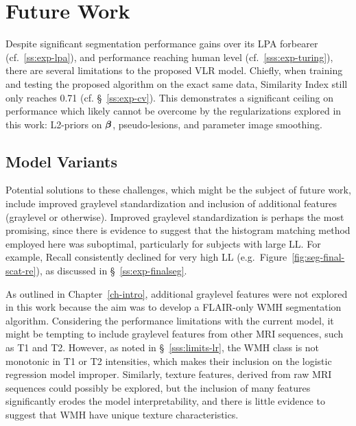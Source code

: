 \section{Future Work}
Despite significant segmentation performance gains over its LPA forbearer (cf.~\ref{ss:exp-lpa}),
and performance reaching human level (cf.~\ref{sss:exp-turing}),
there are several limitations to the proposed VLR model.
Chiefly, when training and testing the proposed algorithm on the exact same data,
Similarity Index still only reaches 0.71 (cf. \S~\ref{ss:exp-cv}).
This demonstrates a significant ceiling on performance
which likely cannot be overcome by the regularizations explored in this work:
L2-priors on $\bm{\beta}$, pseudo-lesions, and parameter image smoothing.
\subsection{Model Variants}
Potential solutions to these challenges, which might be the subject of future work, include
improved graylevel standardization and 
inclusion of additional features (graylevel or otherwise).
Improved graylevel standardization is perhaps the most promising,
since there is evidence to suggest that the histogram matching method employed
here was suboptimal, particularly for subjects with large LL.
For example, Recall consistently declined for very high LL
(e.g.\ Figure~\ref{fig:seg-final-scat-re}), as discussed in \S~\ref{ss:exp-finalseg}.
\par
As outlined in Chapter~\ref{ch-intro}, additional graylevel features were not explored in this work
because the aim was to develop a FLAIR-only WMH segmentation algorithm.
Considering the performance limitations with the current model,
it might be tempting to include graylevel features from other MRI sequences, such as T1 and T2.
However, as noted in \S~\ref{sss:limits-lr}, the WMH class is not monotonic in
T1 or T2 intensities, which makes their inclusion on the logistic regression model improper.
Similarly, texture features, derived from raw MRI sequences could possibly be explored,
but the inclusion of many features significantly erodes the model interpretability,
and there is little evidence to suggest that WMH have unique texture characteristics.

